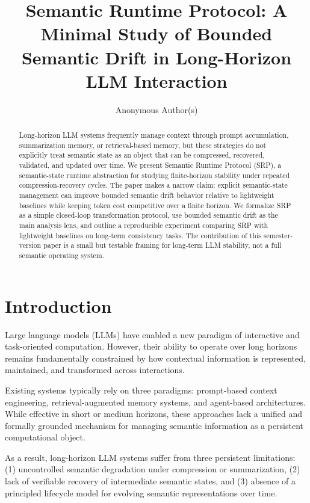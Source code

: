 \documentclass{article}
\title{Semantic Runtime Protocol: A Minimal Study of Bounded Semantic Drift in Long-Horizon LLM Interaction}
\author{Anonymous Author(s)}
\begin{document}
\maketitle

\begin{abstract}
Long-horizon LLM systems frequently manage context through prompt accumulation, summarization memory, or retrieval-based memory, but these strategies do not explicitly treat semantic state as an object that can be compressed, recovered, validated, and updated over time. We present Semantic Runtime Protocol (SRP), a semantic-state runtime abstraction for studying finite-horizon stability under repeated compression-recovery cycles. The paper makes a narrow claim: explicit semantic-state management can improve bounded semantic drift behavior relative to lightweight baselines while keeping token cost competitive over a finite horizon. We formalize SRP as a simple closed-loop transformation protocol, use bounded semantic drift as the main analysis lens, and outline a reproducible experiment comparing SRP with lightweight baselines on long-term consistency tasks. The contribution of this semester-version paper is a small but testable framing for long-term LLM stability, not a full semantic operating system.
\end{abstract}

\section{Introduction}
Large language models (LLMs) have enabled a new paradigm of interactive and task-oriented computation. However, their ability to operate over long horizons remains fundamentally constrained by how contextual information is represented, maintained, and transformed across interactions.

Existing systems typically rely on three paradigms: prompt-based context engineering, retrieval-augmented memory systems, and agent-based architectures. While effective in short or medium horizons, these approaches lack a unified and formally grounded mechanism for managing semantic information as a persistent computational object.

As a result, long-horizon LLM systems suffer from three persistent limitations: (1) uncontrolled semantic degradation under compression or summarization, (2) lack of verifiable recovery of intermediate semantic states, and (3) absence of a principled lifecycle model for evolving semantic representations over time.
\end{document}
